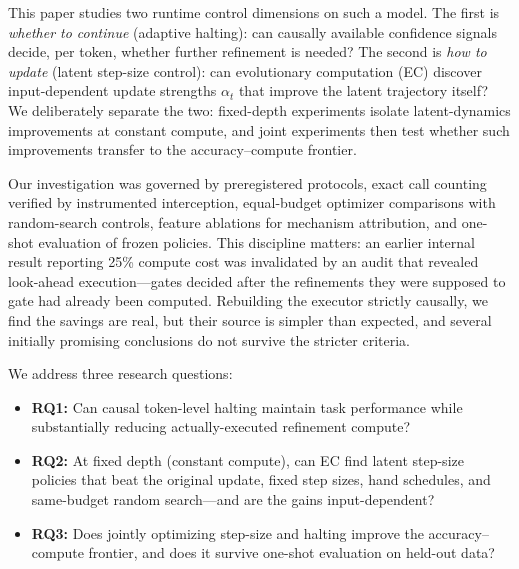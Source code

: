 \documentclass[11pt]{article}
\begin{document}
This paper studies two runtime control dimensions on such a model. The first is \emph{whether to continue} (adaptive halting): can causally available confidence signals decide, per token, whether further refinement is needed? The second is \emph{how to update} (latent step-size control): can evolutionary computation (EC) discover input-dependent update strengths $\alpha_t$ that improve the latent trajectory itself? We deliberately separate the two: fixed-depth experiments isolate latent-dynamics improvements at constant compute, and joint experiments then test whether such improvements transfer to the accuracy--compute frontier.

Our investigation was governed by preregistered protocols, exact call counting verified by instrumented interception, equal-budget optimizer comparisons with random-search controls, feature ablations for mechanism attribution, and one-shot evaluation of frozen policies. This discipline matters: an earlier internal result reporting 25\% compute cost was invalidated by an audit that revealed look-ahead execution---gates decided after the refinements they were supposed to gate had already been computed. Rebuilding the executor strictly causally, we find the savings are real, but their source is simpler than expected, and several initially promising conclusions do not survive the stricter criteria.

We address three research questions:
\begin{itemize}
\item \textbf{RQ1:} Can causal token-level halting maintain task performance while substantially reducing actually-executed refinement compute?
\item \textbf{RQ2:} At fixed depth (constant compute), can EC find latent step-size policies that beat the original update, fixed step sizes, hand schedules, and same-budget random search---and are the gains input-dependent?
\item \textbf{RQ3:} Does jointly optimizing step-size and halting improve the accuracy--compute frontier, and does it survive one-shot evaluation on held-out data?
\end{itemize}
\end{document}
